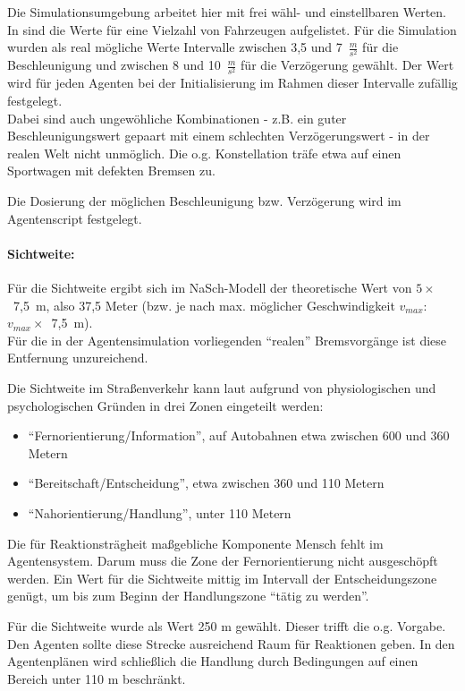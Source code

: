 Die Simulationsumgebung arbeitet hier mit frei wähl- und einstellbaren Werten. 
In \cite{unfallrekonstruktion} sind die Werte für eine Vielzahl von Fahrzeugen aufgelistet. 
Für die Simulation wurden als real mögliche Werte Intervalle zwischen 3,5 und \mbox{7 $\frac{m}{s^{2}}$} für die Beschleunigung und zwischen 8 und \mbox{10 $\frac{m}{s^{2}}$} für die Verzögerung gewählt.
Der Wert wird für jeden Agenten bei der Initialisierung im Rahmen dieser Intervalle zufällig festgelegt.
\\
Dabei sind auch ungewöhliche Kombinationen - z.B. ein guter Beschleunigungswert gepaart mit einem schlechten Verzögerungswert - in der realen Welt nicht unmöglich.
Die o.g. Konstellation träfe etwa auf einen Sportwagen mit defekten Bremsen zu.

Die Dosierung der möglichen Beschleunigung bzw. Verzögerung wird im Agentenscript festgelegt.

\paragraph*{Sichtweite:}
\label{sec:sichtweite}
Für die Sichtweite ergibt sich im NaSch-Modell der theoretische Wert von \mbox{$ 5 \times $ 7,5 m}, also 37,5 Meter (bzw. je nach max. möglicher Geschwindigkeit  $ v_{max} $: \mbox{$ v_{max} \times $ 7,5 m}).
\\
Für die in der Agentensimulation vorliegenden \enquote{realen} Bremsvorgänge ist diese Entfernung unzureichend. 

Die Sichtweite im Straßenverkehr kann laut \cite{sichtweite} aufgrund von physiologischen und psychologischen Gründen in drei Zonen eingeteilt werden:
\begin{itemize}
\itemsep0em
	\item \enquote{Fernorientierung/Information}, auf Autobahnen etwa zwischen 600 und 360 Metern
	\item \enquote{Bereitschaft/Entscheidung}, etwa zwischen 360 und 110 Metern
	\item \enquote{Nahorientierung/Handlung}, unter 110 Metern
\end{itemize}

Die für Reaktionsträgheit maßgebliche Komponente Mensch fehlt im Agentensystem. 
Darum muss die Zone der Fernorientierung nicht ausgeschöpft werden.
Ein Wert für die Sichtweite mittig im Intervall der Entscheidungszone genügt, um bis zum Beginn der Handlungszone \enquote{tätig zu werden}.

Für die Sichtweite wurde als Wert 250 m gewählt.
Dieser trifft die o.g. Vorgabe. 
Den Agenten sollte diese Strecke ausreichend Raum für Reaktionen geben. 
In den Agentenplänen wird schließlich die Handlung durch Bedingungen auf einen Bereich unter 110 m beschränkt.


